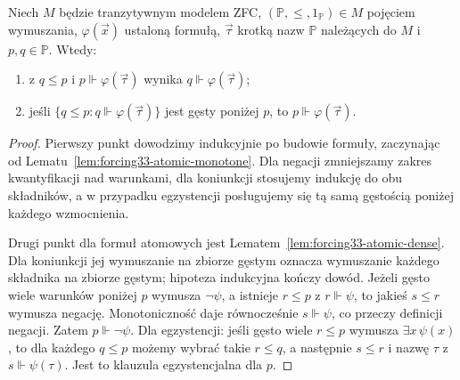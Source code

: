 \begin{lemat}
\label{lem:forcing33-regular}
Niech $M$ będzie tranzytywnym modelem ZFC,
$(\mathbb P,\leq,1_{\mathbb P})\in M$
pojęciem wymuszania,
$\varphi(\vec x)$ ustaloną formułą,
$\vec\tau$ krotką nazw $\mathbb P$
należących do $M$ i $p,q\in\mathbb P$.
Wtedy:
\begin{enumerate}
\item z $q\leq p$ i $p\Vdash\varphi(\vec\tau)$
wynika $q\Vdash\varphi(\vec\tau)$;
\item jeśli
$\{q\leq p:q\Vdash\varphi(\vec\tau)\}$
jest gęsty poniżej $p$, to
$p\Vdash\varphi(\vec\tau)$.
\end{enumerate}
\end{lemat}
\begin{proof}
Pierwszy punkt dowodzimy indukcyjnie
po budowie formuły, zaczynając od
Lematu~\ref{lem:forcing33-atomic-monotone}.
Dla negacji zmniejszamy zakres
kwantyfikacji nad warunkami,
dla koniunkcji stosujemy indukcję
do obu składników, a w przypadku
egzystencji posługujemy się tą samą
gęstością poniżej każdego wzmocnienia.

Drugi punkt dla formuł atomowych jest
Lematem~\ref{lem:forcing33-atomic-dense}.
Dla koniunkcji jej wymuszanie
na zbiorze gęstym oznacza wymuszanie
każdego składnika na zbiorze gęstym;
hipoteza indukcyjna kończy dowód.
Jeżeli gęsto wiele warunków poniżej
$p$ wymusza $\neg\psi$, a istnieje
$r\leq p$ z $r\Vdash\psi$,
to jakieś $s\leq r$ wymusza negację.
Monotoniczność daje równocześnie
$s\Vdash\psi$, co przeczy definicji
negacji. Zatem $p\Vdash\neg\psi$.
Dla egzystencji: jeśli gęsto
wiele $r\leq p$ wymusza
$\exists x\,\psi(x)$, to dla każdego
$q\leq p$ możemy wybrać takie
$r\leq q$, a następnie $s\leq r$
i nazwę $\tau$ z
$s\Vdash\psi(\tau)$. Jest to
klauzula egzystencjalna dla $p$.
\end{proof}

